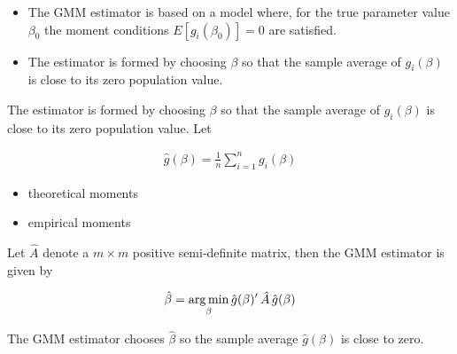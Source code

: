 \begin{frame}

\begin{itemize}\setlength\itemsep{1em}
\item The GMM estimator is based on a model where, for the true parameter value $\beta_0$ the moment conditions
$E[g_i (\beta_0)] = 0$ are satisfied.
\item The estimator is formed by choosing $\beta$ so that the sample average of $g_i(\beta)$ is close to
its zero population value.
\end{itemize}

\end{frame}
\begin{frame}

The estimator is formed by choosing $\beta$ so that the sample average of $g_i(\beta)$ is close to its zero population value. Let

\begin{align*}
\hat{g}(\beta) = \frac{1}{n} \sum_{i=1}^n g_i(\beta)
\end{align*}

\begin{itemize}\setlength\itemsep{1em}
\item theoretical moments
\item empirical moments
\end{itemize}

\end{frame}
\begin{frame}
Let $\hat{A}$ denote a $m \times m$ positive semi-definite matrix, then the GMM estimator is given by

\begin{align*}
\hat{\beta} = \operatorname*{arg\,min}_\beta \hat{g}(\beta)^\prime\,\hat{A}\,\hat{g}(\beta)
\end{align*}

The GMM estimator chooses $\hat{\beta}$ so the sample average $\hat{g}(\beta)$ is close to zero.

\end{frame}
